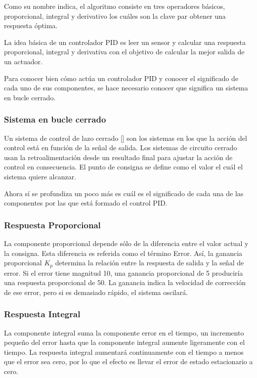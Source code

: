 Como su nombre indica, el algoritmo consiste en tres operadores básicos, proporcional, integral y derivativo los cuáles son la clave par obtener una respuesta óptima. \newline

La idea básica de un controlador PID es leer un sensor y calcular una respuesta proporcional, integral y derivativa con el objetivo de calcular la mejor salida de un actuador. \newline

Para conocer bien cómo actúa un controlador PID y conocer el significado de cada uno de sus componentes, se hace necesario conocer que significa un sistema en bucle cerrado. 

\subsubsection{Sistema en bucle cerrado}
Un sistema de control de lazo cerrado [] son los sistemas en los que la acción del control está en función de la señal de salida. Los sistemas de circuito cerrado usan la retroalimentación desde un resultado final para ajustar la acción de control en consecuencia. El punto de consigna se define como el valor el cuál el sistema quiere alcanzar. \newline

Ahora sí se profundiza un poco más es cuál es el significado de cada una de las componentes por las que está formado el control PID.\newline
\subsubsection{Respuesta Proporcional}

La componente proporcional depende sólo de la diferencia entre el valor actual y la consigna. Esta diferencia es referida como el término Error. Así, la ganancia proporcional $K_{p}$ determina la relación entre la respuesta de salida y la señal de error. Si el error tiene magnitud 10, una ganancia proporcional de 5 produciría una respuesta proporcional de 50. La ganancia indica la velocidad de corrección de ese error, pero si es demasiado rápido, el sistema oscilará. 
\subsubsection{Respuesta Integral}
La componente integral suma la componente error en el tiempo, un incremento pequeño del error hasta que la componente integral aumente ligeramente con el tiempo. La respuesta integral aumentará continuamente con el tiempo a menos que el error sea cero, por lo que el efecto es llevar el error de estado estacionario a cero.
